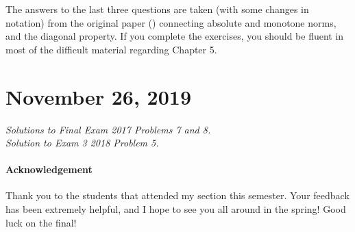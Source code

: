 \documentclass[11pt]{article}
\theoremstyle{plain}
\theoremstyle{definition}
\theoremstyle{remark}
\begin{document}
The answers to the last three questions are taken (with some changes in notation) from the original paper (\citet{monotone}) connecting absolute and monotone norms, and the diagonal property. If you complete the exercises, you should be fluent in most of the difficult material regarding Chapter 5.

\section{November 26, 2019}

{\it Solutions to Final Exam 2017 Problems 7 and 8.}\\
{\it Solution to Exam 3 2018 Problem 5.}

\paragraph{Acknowledgement} Thank you to the students that attended my section this semester. Your feedback has been extremely helpful, and I hope to see you all around in the spring! Good luck on the final!

\newpage

\vspace{5mm}

%


\newpage
\end{document}
